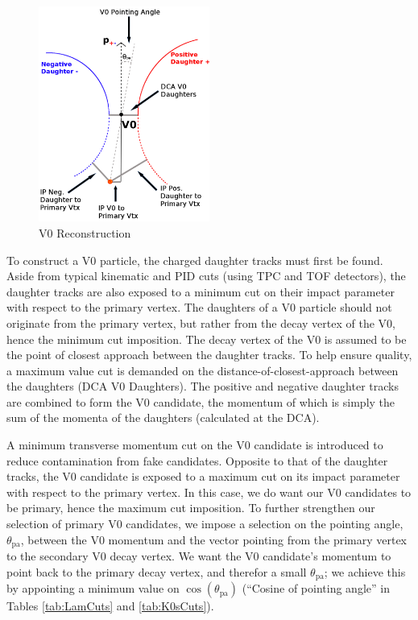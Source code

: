 \documentclass[/home/jesse/Analysis/FemtoAnalysis/AnalysisNotes/AnalysisNoteJBuxton.tex]{subfiles}
\begin{document}
\begin{figure}[h]
  \centering
  \includegraphics[width=0.5\textwidth]{3_DataSelection/Figures/V0CutsGeneral.pdf}
  \caption[V0 Reconstruction]{V0 Reconstruction}
  \label{fig:V0Reconstruction}
\end{figure}

To construct a V0 particle, the charged daughter tracks must first be found.  
Aside from typical kinematic and PID cuts (using TPC and TOF detectors), the daughter tracks are also exposed to a minimum cut on their impact parameter with respect to the primary vertex.  
The daughters of a V0 particle should not originate from the primary vertex, but rather from the decay vertex of the V0, hence the minimum cut imposition.  
The decay vertex of the V0 is assumed to be the point of closest approach between the daughter tracks.
To help ensure quality, a maximum value cut is demanded on the distance-of-closest-approach between the daughters (DCA V0 Daughters).
The positive and negative daughter tracks are combined to form the V0 candidate, the momentum of which is simply the sum of the momenta of the daughters (calculated at the DCA).

A minimum transverse momentum cut on the V0 candidate is introduced to reduce contamination from fake candidates.
Opposite to that of the daughter tracks, the V0 candidate is exposed to a maximum cut on its impact parameter with respect to the primary vertex.
In this case, we do want our V0 candidates to be primary, hence the maximum cut imposition.
To further strengthen our selection of primary V0 candidates, we impose a selection on the pointing angle, $\theta_{\mathrm{pa}}$, between the V0 momentum and the vector pointing from the primary vertex to the secondary V0 decay vertex.
We want the V0 candidate's momentum to point back to the primary decay vertex, and therefor a small $\theta_{\mathrm{pa}}$; we achieve this by appointing a minimum value on $\cos(\theta_{\mathrm{pa}})$ (``Cosine of pointing angle'' in Tables \ref{tab:LamCuts} and \ref{tab:K0sCuts}).
\end{document}
